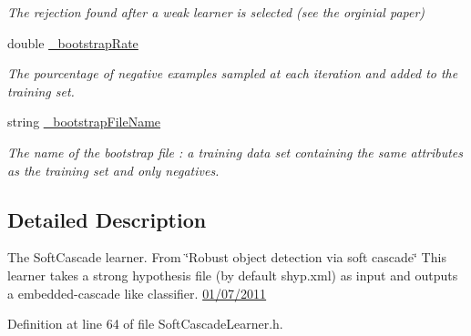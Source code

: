 \begin{DoxyCompactItemize}
\begin{DoxyCompactList}\small\item\em The rejection found after a weak learner is selected (see the orginial paper) \end{DoxyCompactList}\item 
\hypertarget{classMultiBoost_1_1SoftCascadeLearner_ae86da868d6a33510a6dd98c408d41b34}{double \hyperlink{classMultiBoost_1_1SoftCascadeLearner_ae86da868d6a33510a6dd98c408d41b34}{\-\_\-bootstrap\-Rate}}\label{classMultiBoost_1_1SoftCascadeLearner_ae86da868d6a33510a6dd98c408d41b34}

\begin{DoxyCompactList}\small\item\em The pourcentage of negative examples sampled at each iteration and added to the training set. \end{DoxyCompactList}\item 
\hypertarget{classMultiBoost_1_1SoftCascadeLearner_aa5bf9021420be7dfd8e29c6d1f4c78df}{string \hyperlink{classMultiBoost_1_1SoftCascadeLearner_aa5bf9021420be7dfd8e29c6d1f4c78df}{\-\_\-bootstrap\-File\-Name}}\label{classMultiBoost_1_1SoftCascadeLearner_aa5bf9021420be7dfd8e29c6d1f4c78df}

\begin{DoxyCompactList}\small\item\em The name of the bootstrap file \-: a training data set containing the same attributes as the training set and only negatives. \end{DoxyCompactList}\end{DoxyCompactItemize}


\subsection{Detailed Description}
The Soft\-Cascade learner. From \char`\"{}\-Robust object detection via soft cascade\char`\"{} This learner takes a strong hypothesis file (by default shyp.\-xml) as input and outputs a embedded-\/cascade like classifier. \hyperlink{}{01/07/2011 }

Definition at line 64 of file Soft\-Cascade\-Learner.\-h.



